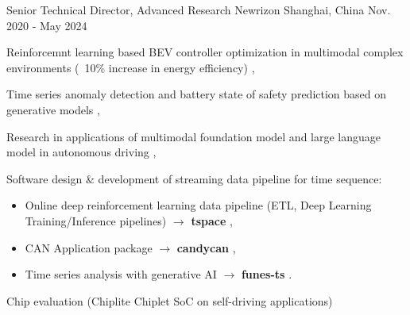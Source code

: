 \documentclass[../resume.tex]{subfiles}
\begin{document}


\begin{cventries}

  \cventry
    {Senior Technical Director, Advanced Research} %
    {Newrizon} %
    {Shanghai, China} %
    {Nov. 2020 - May 2024} %
    {
      \begin{cvitems} %
          \item Reinforcemnt learning based BEV controller optimization in multimodal complex environments (~10\% increase in energy efficiency) \supercite{Xin_VEOS_22},
          \item Time series anomaly detection and battery state of safety prediction based on generative models \supercite{Xin_GenAI_23},
          \item Research in applications of multimodal foundation model and large language model in autonomous driving \supercite{Xin_VLM_24} \supercite{Xin_Latent_Diffusion_23},
          \item Software design \& development of streaming data pipeline for time sequence:
            \begin{itemize}
                    \item Online deep reinforcement learning data pipeline (ETL, Deep Learning Training/Inference pipelines) $\rightarrow$ \textbf{tspace} \href{https://binjian.github.io/tspace/}{\faGithub},
                    \item CAN Application package $\rightarrow$ \textbf{candycan} \href{https://binjian.github.io/candycan/}{\faGithub},
                    \item Time series analysis with generative AI $\rightarrow$ \textbf{funes-ts} \href{https://github.com/binjian/funes-ts/}{\faGithub}.
            \end{itemize}
          \item Chip evaluation (Chiplite Chiplet SoC on self-driving applications)
      \end{cvitems}
    }


\end{cventries}
\end{document}
